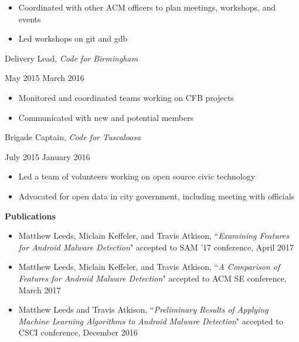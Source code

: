 \documentclass[11pt]{article}
\begin{document}
\begin{itemize}
  \item Coordinated with other ACM officers to plan meetings, workshops, and events
  \item Led workshops on git and gdb
\end{itemize}

\vspace{0.4em}
\begin{minipage}[t]{0.65\textwidth}
\flushleft
Delivery Lead, \textit{Code for Birmingham}\\
\end{minipage}
\begin{minipage}[t]{0.30\textwidth}
\flushright
May 2015 \space \textemdash \space March 2016\\
\end{minipage}

\begin{itemize}
  \item Monitored and coordinated teams working on CFB projects
  \item Communicated with new and potential members
\end{itemize}

\begin{minipage}[t]{0.65\textwidth}
\flushleft
Brigade Captain, \textit{Code for Tuscaloosa}\\
\end{minipage}
\begin{minipage}[t]{0.30\textwidth}
\flushright
July 2015 \space \textemdash \space January 2016\\
\end{minipage}

\begin{itemize}
  \item Led a team of volunteers working on open source civic technology
  \item Advocated for open data in city government, including meeting with officials
\end{itemize}

\vspace{0.8em}
\hbox{\large \textbf{Publications}}

\begin{itemize}[itemindent=0em]
  \item Matthew Leeds, Miclain Keffeler, and Travis Atkison, ``\textit{Examining Features for Android Malware Detection}" accepted to SAM '17 conference, April 2017
  \item Matthew Leeds, Miclain Keffeler, and Travis Atkison, ``\textit{A Comparison of Features for Android Malware Detection}" accepted to ACM SE conference, March 2017
  \item Matthew Leeds and Travis Atkison, ``\textit{Preliminary Results of Applying Machine Learning Algorithms to Android Malware Detection}" accepted to CSCI conference, December 2016
\end{itemize}
\end{document}
